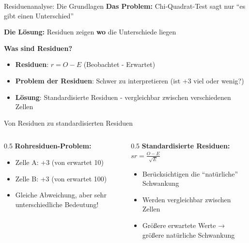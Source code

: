 \documentclass[
  ignorenonframetext,
]{beamer}
\providecommand{\tightlist}{%
  \setlength{\itemsep}{0pt}\setlength{\parskip}{0pt}}
\begin{document}
\begin{frame}{Residuenanalyse: Die Grundlagen}
\protect{}\label{residuenanalyse-die-grundlagen}
\textbf{Das Problem:} Chi-Quadrat-Test sagt nur ``es gibt einen
Unterschied''

\textbf{Die Lösung:} Residuen zeigen \textbf{wo} die Unterschiede liegen

\textbf{Was sind Residuen?}

\begin{itemize}
\tightlist
\item
  \textbf{Residuen}: \(r = O - E\) (Beobachtet - Erwartet)
\item
  \textbf{Problem der Residuen}: Schwer zu interpretieren (ist +3 viel
  oder wenig?)
\item
  \textbf{Lösung}: Standardisierte Residuen - vergleichbar zwischen
  verschiedenen Zellen
\end{itemize}
\end{frame}

\begin{frame}{Von Residuen zu standardisierten Residuen}
\protect{}\label{von-residuen-zu-standardisierten-residuen}
\begin{columns}[T]
\begin{column}{0.5\linewidth}
\textbf{Rohresiduen-Problem:}

\begin{itemize}
\tightlist
\item
  Zelle A: +3 (von erwartet 10)
\item
  Zelle B: +3 (von erwartet 100)
\item
  Gleiche Abweichung, aber sehr unterschiedliche Bedeutung!
\end{itemize}
\end{column}

\begin{column}{0.5\linewidth}
\textbf{Standardisierte Residuen:} \(sr = \frac{O - E}{\sqrt{E}}\)

\begin{itemize}
\tightlist
\item
  Berücksichtigen die ``natürliche'' Schwankung
\item
  Werden vergleichbar zwischen Zellen
\item
  Größere erwartete Werte → größere natürliche Schwankung
\end{itemize}
\end{column}
\end{columns}
\end{frame}
\end{document}
